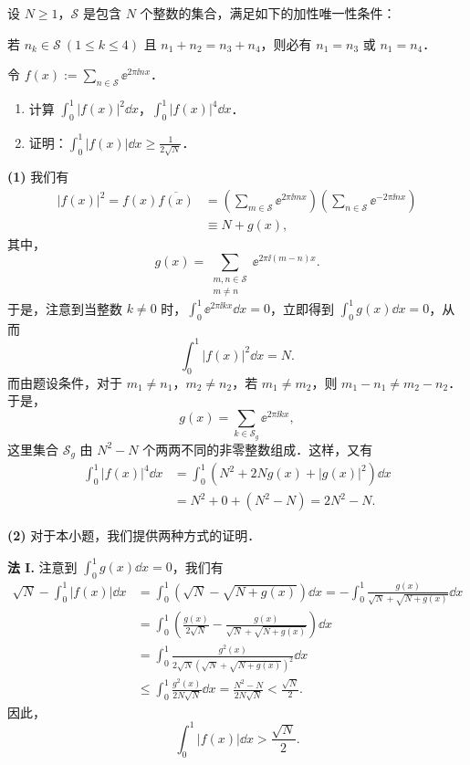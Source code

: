 设 $N\geqslant 1$，$\mathcal{S}$ 是包含 $N$ 个整数的集合，满足如下的加性唯一性条件：

若 $n_k\in\mathcal{S}\ (1\leqslant k\leqslant 4)$ 且 $n_1+n_2=n_3+n_4$，则必有 $n_1=n_3$ 或 $n_1=n_4$．

令 $f(x):=\sum\limits_{n\in\mathcal{S}}\ee^{2\pi\ii nx}$．
\begin{enumerate}[label=(\arabic*)]
  \item 计算 $\displaystyle\int_0^1|f(x)|^2\dd x$，$\displaystyle\int_0^1|f(x)|^4\dd x$．
  \item 证明：$\displaystyle\int_0^1|f(x)|\dd x\geqslant\frac{1}{2\sqrt{N}}$．
\end{enumerate}
\begin{solution}
\textbf{(1)} 我们有
\begin{align*}
  |f(x)|^2=f(x)\overline{f(x)}
  &=\left(\sum_{m\in\mathcal{S}}\ee^{2\pi\ii mx}\right)\left(\sum_{n\in\mathcal{S}}\ee^{-2\pi\ii nx}\right)\\
  &\equiv N+g(x),
\end{align*}
其中，
\[
  g(x)=\sum_{\substack{m,n\in\mathcal{S}\\ m\neq n}}\ee^{2\pi\ii(m-n)x}.
\]
于是，注意到当整数 $k\neq 0$ 时，$\displaystyle\int_0^1\ee^{2\pi\ii kx}\dd x=0$，立即得到 $\displaystyle\int_0^1 g(x)\dd x=0$，从而
\[
  \int_0^1|f(x)|^2\dd x=N.
\]
而由题设条件，对于 $m_1\neq n_1$，$m_2\neq n_2$，若 $m_1\neq m_2$，则 $m_1-n_1\neq m_2-n_2$．于是，
\[
  g(x)=\sum_{k\in\mathcal{S}_g}\ee^{2\pi\ii kx},
\]
这里集合 $\mathcal{S}_g$ 由 $N^2-N$ 个两两不同的非零整数组成．这样，又有
\begin{align*}
  \int_0^1|f(x)|^4\dd x
  &=\int_0^1\left(N^2+2Ng(x)+|g(x)|^2\right)\dd x\\
  &=N^2+0+(N^2-N)=2N^2-N.
\end{align*}

\textbf{(2)} 对于本小题，我们提供两种方式的证明．

\textbf{法 I.} 注意到 $\displaystyle\int_0^1 g(x)\dd x=0$，我们有
\begin{align*}
  \sqrt{N}-\int_0^1|f(x)|\dd x
  &=\int_0^1\left(\sqrt{N}-\sqrt{N+g(x)}\right)\dd x
  =-\int_0^1\frac{g(x)}{\sqrt{N}+\sqrt{N+g(x)}}\dd x\\
  &=\int_0^1\left(\frac{g(x)}{2\sqrt{N}}-\frac{g(x)}{\sqrt{N}+\sqrt{N+g(x)}}\right)\dd x\\
  &=\int_0^1\frac{g^2(x)}{2\sqrt{N}\left(\sqrt{N}+\sqrt{N+g(x)}\right)^2}\dd x\\
  &\leqslant\int_0^1\frac{g^2(x)}{2N\sqrt{N}}\dd x
  =\frac{N^2-N}{2N\sqrt{N}}<\frac{\sqrt{N}}{2}.
\end{align*}
因此，
\[
  \int_0^1|f(x)|\dd x>\frac{\sqrt{N}}{2}.
\]


\end{solution}
